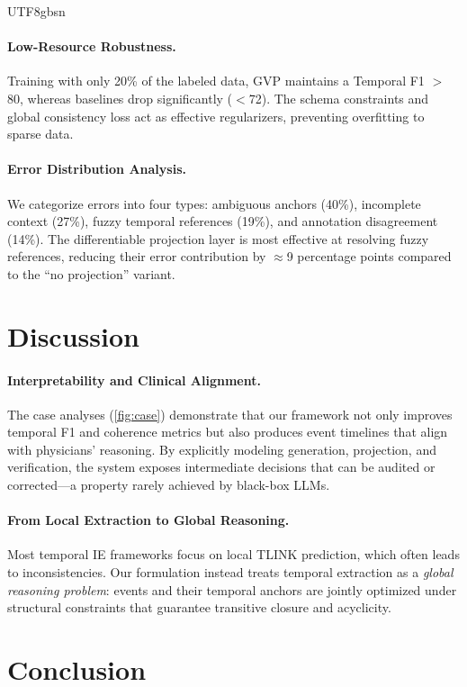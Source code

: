 \documentclass[11pt]{article}
\begin{document}
\begin{CJK*}{UTF8}{gbsn}
\paragraph{Low-Resource Robustness.}
Training with only 20\% of the labeled data, \textsc{GVP} maintains a Temporal F1 $>$80, whereas baselines drop significantly ($<$72). The schema constraints and global consistency loss act as effective regularizers, preventing overfitting to sparse data.

\paragraph{Error Distribution Analysis.}
We categorize errors into four types: ambiguous anchors (40\%), incomplete context (27\%), fuzzy temporal references (19\%), and annotation disagreement (14\%). The differentiable projection layer is most effective at resolving fuzzy references, reducing their error contribution by $\approx$9 percentage points compared to the ``no projection'' variant.

\section{Discussion}
\label{sec:discussion}

\paragraph{Interpretability and Clinical Alignment.}
The case analyses (\cref{fig:case}) demonstrate that our framework not only improves temporal F1 and coherence metrics but also produces event timelines that align with physicians’ reasoning. By explicitly modeling generation, projection, and verification, the system exposes intermediate decisions that can be audited or corrected—a property rarely achieved by black-box LLMs.

\paragraph{From Local Extraction to Global Reasoning.}
Most temporal IE frameworks focus on local TLINK prediction, which often leads to inconsistencies. Our formulation instead treats temporal extraction as a \textit{global reasoning problem}: events and their temporal anchors are jointly optimized under structural constraints that guarantee transitive closure and acyclicity.

\section{Conclusion}
\label{sec:conclusion}


\end{CJK*}
\end{document}
